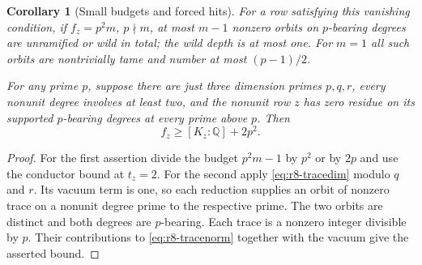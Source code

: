 \documentclass[11pt,a4paper]{article}
\numberwithin{equation}{section}
\newtheorem{corollary}[theorem]{Corollary}
\theoremstyle{remark}
\newcommand{\QQ}{\mathbb Q}
\begin{document}
\begin{corollary}[Small budgets and forced hits]\label{fam:M:5.6}\label{cor:defect-two-energy-stratum}
\label{cor:three-prime-mixed-energy}
For a row satisfying this vanishing condition, if $f_z=p^2m$, $p\nmid m$, at most $m-1$
nonzero orbits on $p$-bearing degrees are unramified or wild in
total; the wild depth is at most one. For $m=1$ all such orbits are
nontrivially tame and number at most $(p-1)/2$.

For any prime $p$, suppose there are just three dimension primes
$p,q,r$, every nonunit degree involves at least two, and the
nonunit row $z$ has zero residue on its supported $p$-bearing degrees
at every prime above $p$. Then
\[
                          f_z\ge [K_z:\QQ]+2p^2 .
\]
\end{corollary}
\begin{proof}
For the first assertion divide the budget $p^2m-1$ by $p^2$ or by
$2p$ and use the conductor bound at $t_z=2$. For the second apply
\eqref{eq:r8-tracedim} modulo $q$ and $r$. Its vacuum term is one,
so each reduction supplies an orbit of nonzero trace on a nonunit
degree prime to the respective prime. The two orbits are distinct
and both degrees are $p$-bearing. Each trace is a nonzero integer
divisible by $p$. Their contributions to \eqref{eq:r8-tracenorm}
together with the vacuum give the asserted bound.
\end{proof}
\end{document}
